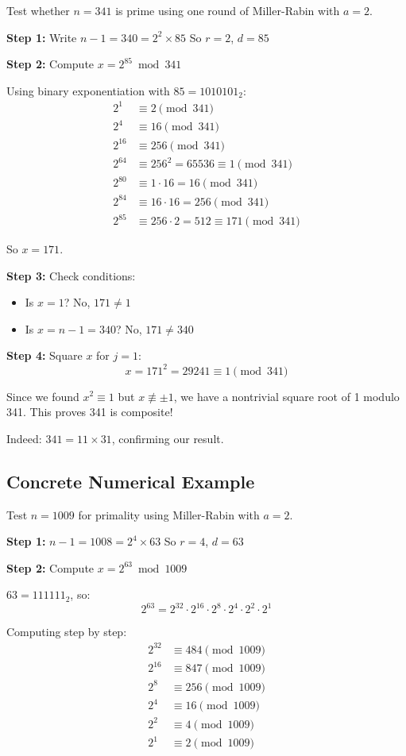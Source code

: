 \documentclass[12pt,a4paper]{article}
\theoremstyle{definition}
\begin{document}
Test whether $n = 341$ is prime using one round of Miller-Rabin with $a = 2$.

\textbf{Step 1:} Write $n-1 = 340 = 2^2 \times 85$
So $r = 2$, $d = 85$

\textbf{Step 2:} Compute $x = 2^{85} \bmod 341$

Using binary exponentiation with $85 = 1010101_2$:
\begin{align}
2^1 &\equiv 2 \pmod{341}\\
2^4 &\equiv 16 \pmod{341}\\
2^{16} &\equiv 256 \pmod{341}\\
2^{64} &\equiv 256^2 = 65536 \equiv 1 \pmod{341}\\
2^{80} &\equiv 1 \cdot 16 = 16 \pmod{341}\\
2^{84} &\equiv 16 \cdot 16 = 256 \pmod{341}\\
2^{85} &\equiv 256 \cdot 2 = 512 \equiv 171 \pmod{341}
\end{align}

So $x = 171$.

\textbf{Step 3:} Check conditions:
\begin{itemize}
    \item Is $x = 1$? No, $171 \neq 1$
    \item Is $x = n-1 = 340$? No, $171 \neq 340$
\end{itemize}

\textbf{Step 4:} Square $x$ for $j = 1$:
\[x = 171^2 = 29241 \equiv 1 \pmod{341}\]

Since we found $x^2 \equiv 1$ but $x \not\equiv \pm 1$, we have a nontrivial square root of 1 modulo 341. This proves 341 is composite!

Indeed: $341 = 11 \times 31$, confirming our result.

\subsection{Concrete Numerical Example}

Test $n = 1009$ for primality using Miller-Rabin with $a = 2$.

\textbf{Step 1:} $n-1 = 1008 = 2^4 \times 63$
So $r = 4$, $d = 63$

\textbf{Step 2:} Compute $x = 2^{63} \bmod 1009$

$63 = 111111_2$, so:
\[2^{63} = 2^{32} \cdot 2^{16} \cdot 2^{8} \cdot 2^{4} \cdot 2^{2} \cdot 2^{1}\]

Computing step by step:
\begin{align}
2^{32} &\equiv 484 \pmod{1009}\\
2^{16} &\equiv 847 \pmod{1009}\\
2^8 &\equiv 256 \pmod{1009}\\
2^4 &\equiv 16 \pmod{1009}\\
2^2 &\equiv 4 \pmod{1009}\\
2^1 &\equiv 2 \pmod{1009}
\end{align}
\end{document}

